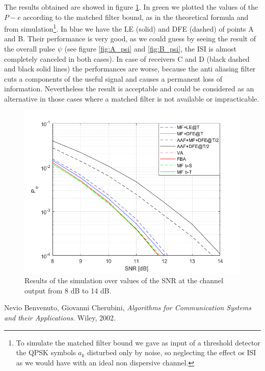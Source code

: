 \documentclass[a4paper,11.5pt]{article}
\begin{document}
The results obtained are showed in figure \ref{fig:SNR}. In green we plotted the values of the $P-e$ according to the matched filter bound, as in the theoretical formula and from simulation\footnote{To simulate the matched filter bound we gave as input of a threshold detector the QPSK symbols $a_k$ disturbed only by noise, so neglecting the effect os ISI as we would have with an ideal non dispersive channel.}. In blue we have the LE (solid) and DFE (dashed) of points A and B. Their performance is very good, as we could guess by seeing the result of the overall pulse $\psi$ (see figure \ref{fig:A_psi} and \ref{fig:B_psi}, the ISI is almost completely canceled in both cases).
In case of receivers C and D (black dashed and black solid lines) the performances are worse, because the anti aliasing filter cuts a components of the useful signal and causes a permanent loss of information. Nevertheless the result is acceptable and could be considered as an alternative in those cases where a matched filter is not available or impracticable.


\begin{figure}[ht]
	\begin{center}   
		\includegraphics[width=\textwidth]{figs/SNR_Pe.png} 
		\caption{Results of the simulation over values of the SNR at the channel output from 8 dB to 14 dB.}
		\label{fig:SNR}
	\end{center}
\end{figure}


 




\begin{thebibliography}{15}
	
	Nevio Benvenuto, Giovanni Cherubini,
	\textit{Algorithms for Communication Systems and their Applications}. 
	Wiley, 2002.
	

	
\end{thebibliography}
\end{document}
